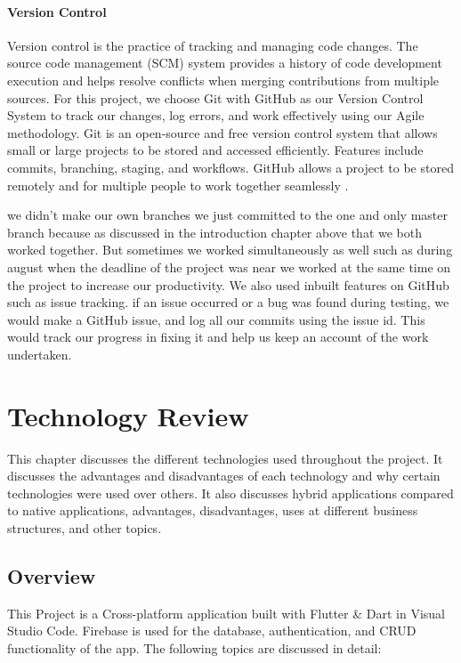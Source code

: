 \subsubsection{Version Control}
Version control is the practice of tracking and managing code changes. The source code management (SCM) system provides a history of code development execution and helps resolve conflicts when merging contributions from multiple sources. For this
project, we choose Git with GitHub as our Version Control System to track our changes, log errors, and work effectively using our Agile methodology. Git is an open-source and free version control system that allows small or large projects to be stored and accessed efficiently. Features include commits, branching, staging, and workflows. GitHub allows a project to be stored remotely and for multiple people to work together seamlessly \cite{GitHub:online}.

we didn't make our own branches we just committed to the one and only master branch because as discussed in the introduction chapter above that we both worked together. But sometimes we worked simultaneously as well such as during august when the deadline of the project was near we worked at the same time on the project to increase our productivity. We also used inbuilt features on GitHub such as issue tracking. if an issue occurred or a bug was found during testing, we would make a GitHub issue, and log all our commits using the issue id. This would track our progress in fixing it and help us keep an account of the work undertaken.

\chapter{Technology Review}
This chapter discusses the different technologies used throughout the project. It discusses the advantages and disadvantages of each technology and why certain technologies were used over others. It also discusses hybrid applications compared to native applications, advantages, disadvantages, uses at different business structures, and other topics.

\section{Overview}
This Project is a Cross-platform application built with Flutter \& Dart in Visual Studio Code. Firebase is used for the database, authentication, and CRUD functionality of the app.
The following topics are discussed in detail:

